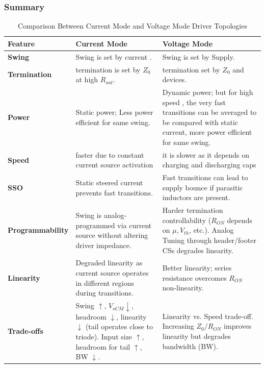 \documentclass[12pt, a4paper]{report}
\begin{document}
 \subsubsection{Summary} \label{ssubsec:Summary}
\begin{table}[htbp]
    \centering
    \caption{Comparison Between Current Mode and Voltage Mode Driver Topologies}
    \label{tab:driver_comparison}
    \begin{tabularx}{\textwidth}{l X X}
        \toprule
        \textbf{Feature} & \textbf{Current Mode} & \textbf{Voltage Mode} \\
        \midrule
        \textbf{Swing} & Swing is set by current . & Swing is set by Supply. \\
        \addlinespace
        \textbf{Termination} & termination is set by $Z_0$ at high $R_{out}$. &  termination set by $Z_0$ and devices. \\
        \addlinespace
        \textbf{Power} & Static power; Less power efficient for same swing. & Dynamic power;  but for high speed , the very fast transitions can be averaged to be compared with static current,  more power efficient for same swing. \\
        \addlinespace
        \textbf{Speed} & faster due to constant current source activation  &  it is slower as it depends on charging and discharging caps \\        

        \addlinespace
        \textbf{SSO} & Static steered current prevents fast transitions. & Fast transitions can lead to supply bounce if parasitic inductors are present. \\
        \addlinespace
        \textbf{Programmability} & Swing is analog-programmed via current source without altering driver impedance. & Harder termination controllability ($R_{ON}$ depends on $\mu, V_{th}$, etc.). Analog Tuning through header/footer CSs degrades linearity. \\
        \addlinespace
        \textbf{Linearity} & Degraded linearity as current source operates in different regions during transitions. & Better linearity; series resistance overcomes $R_{ON}$ non-linearity. \\
        \addlinespace
        \textbf{Trade-offs} & Swing $\uparrow$, $V_{oCM} \downarrow$, headroom $\downarrow$, linearity $\downarrow$ (tail operates close to triode). Input size $\uparrow$, headroom for tail $\uparrow$, BW $\downarrow$. & Linearity vs. Speed trade-off. Increasing $Z_0/R_{ON}$ improves linearity but degrades bandwidth (BW). \\
        \bottomrule
    \end{tabularx}
\end{table}
\end{document}
